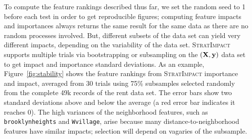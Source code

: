 \documentclass[11pt]{article}
\newcommand{\figref}[1]{Figure~\ref{#1}}
\newcommand{\simp}{\fontfamily{cmr}\textsc{\small StratImpact}}
\begin{document}
To compute the feature rankings described thus far, we set the random seed to 1 before each test in order to get reproducible figures; computing feature impacts and importances always returns the same result for the same data as there are no random processes involved.  But, different subsets of the data set can yield very different impacts, depending on the variability of the data set. \simp{} supports multiple trials via bootstrapping or subsampling on the $(\bf X, y)$ data set to get impact and importance standard deviations.  As an example, \figref{fig:stability} shows the  feature rankings from \simp{} importance and impact, averaged from 30 trials using 75\% subsamples selected randomly from the complete 49k records of the rent data set. The error bars show two standard deviations above and below the average (a red error bar indicates it reaches 0).  The high variances of the neighborhood features, such as {\tt brooklynheights} and {\tt Wvillage}, arise because many distance-to-neighborhood features have similar impacts; selection will depend on vagaries of the subsample.
 
\end{document}
